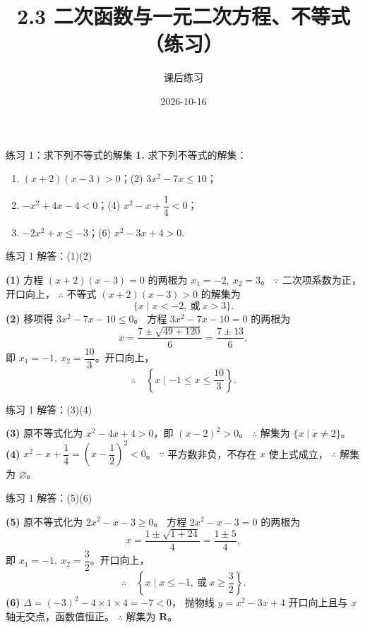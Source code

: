 \documentclass[10pt,aspectratio=169,serif]{beamer}
\title[2.3 练习]{2.3 二次函数与一元二次方程、不等式（练习）}
\subtitle{课后练习}
\author{}
\institute{}
\date{2026-10-16}
\begin{document}
\begin{frame}
  \titlepage
\end{frame}

\begin{frame}[t]{练习 1：求下列不等式的解集}
\textbf{1.} 求下列不等式的解集：
\begin{enumerate}
  \item $(x+2)(x-3)>0$；\qquad (2) $3x^{2}-7x\le 10$；
  \item $-x^{2}+4x-4<0$；\qquad (4) $x^{2}-x+\dfrac{1}{4}<0$；
  \item $-2x^{2}+x\le -3$；\qquad (6) $x^{2}-3x+4>0$.
\end{enumerate}
\end{frame}

\begin{frame}[t]{练习 1 解答：(1)(2)}
\begin{tcolorbox}[colback=orange!10,colframe=orange,title=\textbf{解}]
\textbf{(1)} 方程 $(x+2)(x-3)=0$ 的两根为 $x_{1}=-2,\ x_{2}=3$。
$\because$ 二次项系数为正，开口向上，
$\therefore$ 不等式 $(x+2)(x-3)>0$ 的解集为
\[
\{x\mid x<-2,\ \text{或}\ x>3\}.
\]
\vspace{0.5em}
\textbf{(2)} 移项得 $3x^{2}-7x-10\le 0$。
方程 $3x^{2}-7x-10=0$ 的两根为
\[
x=\frac{7\pm\sqrt{49+120}}{6}=\frac{7\pm 13}{6},
\]
即 $x_{1}=-1,\ x_{2}=\dfrac{10}{3}$。开口向上，
\[
\therefore\quad \left\{x\mid -1\le x\le \frac{10}{3}\right\}.
\]
\end{tcolorbox}
\end{frame}

\begin{frame}[t]{练习 1 解答：(3)(4)}
\begin{tcolorbox}[colback=orange!10,colframe=orange,title=\textbf{解}]
\textbf{(3)} 原不等式化为 $x^{2}-4x+4>0$，即 $(x-2)^{2}>0$。
$\therefore$ 解集为 $\{x\mid x\neq 2\}$。
\vspace{0.5em}
\textbf{(4)} $x^{2}-x+\dfrac{1}{4}=\left(x-\dfrac{1}{2}\right)^{2}<0$。
$\because$ 平方数非负，不存在 $x$ 使上式成立，
$\therefore$ 解集为 $\varnothing$。
\end{tcolorbox}
\end{frame}

\begin{frame}[t]{练习 1 解答：(5)(6)}
\begin{tcolorbox}[colback=orange!10,colframe=orange,title=\textbf{解}]
\textbf{(5)} 原不等式化为 $2x^{2}-x-3\ge 0$。
方程 $2x^{2}-x-3=0$ 的两根为
\[
x=\frac{1\pm\sqrt{1+24}}{4}=\frac{1\pm 5}{4},
\]
即 $x_{1}=-1,\ x_{2}=\dfrac{3}{2}$。开口向上，
\[
\therefore\quad \left\{x\mid x\le -1,\ \text{或}\ x\ge \frac{3}{2}\right\}.
\]
\vspace{0.5em}
\textbf{(6)} $\Delta = (-3)^{2}-4\times 1\times 4 = -7<0$，
抛物线 $y=x^{2}-3x+4$ 开口向上且与 $x$ 轴无交点，函数值恒正。
$\therefore$ 解集为 $\mathbf{R}$。
\end{tcolorbox}
\end{frame}
\end{document}
